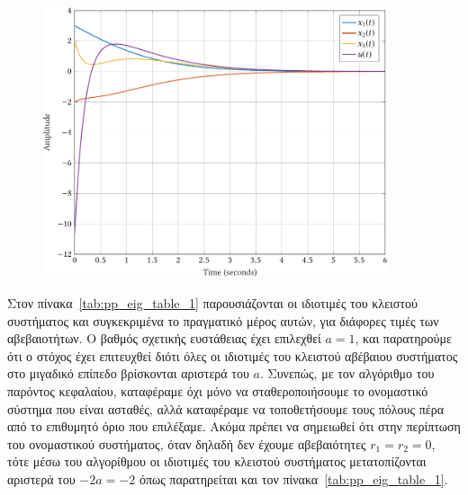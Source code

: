 \begin{figure}[h]
    \centering
    \includegraphics[width=0.9\textwidth]{figures/pp_ex3.pdf}
    \label{fig:pp_ex3}
\end{figure}

Στον πίνακα~\ref{tab:pp_eig_table_1} παρουσιάζονται οι ιδιοτιμές του κλειστού
συστήματος και συγκεκριμένα το πραγματικό μέρος αυτών, για διάφορες τιμές των
αβεβαιοτήτων. Ο βαθμός σχετικής ευστάθειας έχει επιλεχθεί \( a = 1 \), και
παρατηρούμε ότι ο στόχος έχει επιτευχθεί διότι όλες οι ιδιοτιμές του κλειστού
αβέβαιου συστήματος στο μιγαδικό επίπεδο βρίσκονται αριστερά του \( a \). Συνεπώς,
με τον αλγόριθμο του παρόντος κεφαλαίου, καταφέραμε όχι μόνο να σταθεροποιήσουμε το
ονομαστικό σύστημα που είναι ασταθές, αλλά καταφέραμε να τοποθετήσουμε τους πόλους
πέρα από το επιθυμητό όριο που επιλέξαμε. Ακόμα πρέπει να σημειωθεί ότι στην
περίπτωση του ονομαστικού συστήματος, όταν δηλαδή δεν έχουμε αβεβαιότητες \(
r_1 = r_2 = 0 \), τότε μέσω του αλγορίθμου οι ιδιοτιμές του κλειστού συστήματος
μετατοπίζονται αριστερά του \( -2a = -2 \) όπως παρατηρείται και τον
πίνακα~\ref{tab:pp_eig_table_1}.
\begin{table}[h]
    \centering
    \eng{\[
            \begin{tabu}{ c | c | c | c | c | c | c}
                {} & r_1 = r_2 = 0 & r_1 = r_2 = -1 & r_1 = r_2 = 1
                & r_1 = 1, r_2 = -1 & r_1 = 0, r_2 = -1 & r_1 = 1, r_2 = 0 \\
                \hline
                \lambda_1 & -2.6622 & -5.3094 & -1.2506 & -5.866 & -5.6079 & -1.3281 \\
                \lambda_2 & -3 & -1.2914 & -2.3208 & -1.0131 & -1.1421 & -1.3281 \\
                \lambda_3 & -4.1358 & -1.2914 & -2.3208 & -1.0131 & -1.1421 & -4.236 \\
            \end{tabu}
    \]}
    \label{tab:pp_eig_table_1}
\end{table}

